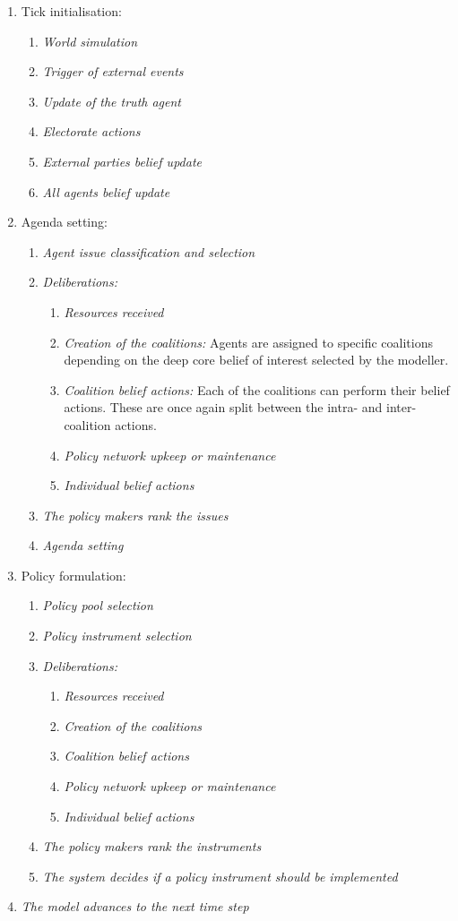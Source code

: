 \begin{enumerate}
\item Tick initialisation:
	\begin{enumerate}
	\item \emph{World simulation}
	\item \emph{Trigger of external events}
	\item \emph{Update of the truth agent}
	\item \emph{Electorate actions}
	\item \emph{External parties belief update}
	\item \emph{All agents belief update}
	\end{enumerate}
\item Agenda setting:
	\begin{enumerate}
	\item \emph{Agent issue classification and selection}
	\item \emph{Deliberations:}
		\begin{enumerate}
		\item \emph{Resources received}
		\item \emph{Creation of the coalitions:} Agents are assigned to specific coalitions depending on the deep core belief of interest selected by the modeller.
		\item \emph{Coalition belief actions:} Each of the coalitions can perform their belief actions. These are once again split between the intra- and inter-coalition actions.
		\item \emph{Policy network upkeep or maintenance}
		\item \emph{Individual belief actions}
		\end{enumerate}
	\item \emph{The policy makers rank the issues}
	\item \emph{Agenda setting}
	\end{enumerate}
\item Policy formulation:
	\begin{enumerate}
	\item \emph{Policy pool selection}
	\item \emph{Policy instrument selection}
	\item \emph{Deliberations:}
		\begin{enumerate}
		\item \emph{Resources received}
		\item \emph{Creation of the coalitions}
		\item \emph{Coalition belief actions}
		\item \emph{Policy network upkeep or maintenance}
		\item \emph{Individual belief actions}
		\end{enumerate}
	\item \emph{The policy makers rank the instruments}
	\item \emph{The system decides if a policy instrument should be implemented}
	\end{enumerate}
\item \emph{The model advances to the next time step}
\end{enumerate}

